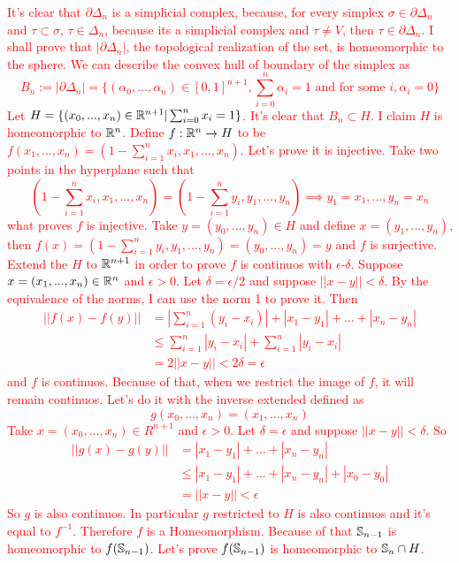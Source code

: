 \textcolor{red}{It's clear that $\partial \Delta_n$ is a simplicial complex, because, for
every simplex $\sigma \in \partial \Delta_n$ and $\tau \subset \sigma$, $\tau
\in \Delta_n$, because its a simplicial complex and $\tau \neq V$, then $\tau
\in \partial \Delta_n$. I shall prove that $|\partial \Delta_n|$, the
topological realization of the set, is homeomorphic to the sphere. 
We can describe the convex hull of boundary of the simplex as 
$$
B_n :=|\partial \Delta_n| = \{(\alpha_0, ..., \alpha_n) \in [0,1]^{n+1}, \sum_{i=0}^n \alpha_i = 1 \text{ and for some } i, \alpha_i = 0\}
$$
Let $H = \{(x_0, ..., x_n) \in \mathbb{R}^{n+1} | \sum_{i=0}^n x_i = 1\}$. It's clear
that $B_n \subset H$. I claim $H$ is homeomorphic to $\mathbb{R}^n$. Define
$f: \mathbb{R}^n \to H$ to be $f(x_1, ...,x_n) = (1 - \sum_{i=1}^n x_i, x_1, ...,
x_n)$. Let's prove it is injective. Take two points in the hyperplane such
that 
$$
(1 - \sum_{i=1}^n x_i, x_1, ...,
x_n) = (1 - \sum_{i=1}^n y_i, y_1, ...,
y_n) \implies y_1 = x_1, ..., y_n = x_n
$$
what proves $f$ is injective. Take $y = (y_0, ..., y_n) \in H$ and define $x =
(y_1, ..., y_n)$, then $f(x) = (1 - \sum_{i=1}^n y_i, y_1, ..., y_n) = (y_0,
..., y_n) = y$ and $f$ is surjective. Extend the $H$ to $\mathbb{R}^{n+1}$ in order to
prove $f$ is continuos with $\epsilon$-$\delta$. Suppose $x = (x_1, ..., x_n)
\in \mathbb{R}^n$ and $\epsilon > 0$. Let $\delta = \epsilon/2 $ and suppose $||x - y|| <
\delta$. By the equivalence of the norms, I can use the norm 1 to prove it. Then
\begin{equation*}
    \begin{split}
        ||f(x) - f(y)|| &= |\sum_{i=1}^n (y_i - x_i)| + |x_1 - y_1| + ... + |x_n - y_n| \\
        &\le \sum_{i=1}^n |y_i - x_i| + \sum_{i=1}^n |y_i - x_i| \\
        &= 2||x - y|| < 2\delta = \epsilon
    \end{split}
\end{equation*}
and $f$ is continuos. Because of that, when we restrict the image of $f$, it
will remain continuos. Let's do it with the inverse extended defined as
$$
g(x_0, ..., x_n) = (x_1,...,x_n)
$$
Take $x = (x_0,...,x_n) \in R^{n+1}$ and $\epsilon > 0$. Let $\delta =
\epsilon$ and suppose $||x-y||<\delta$. So 
\begin{equation*}
    \begin{split}
        ||g(x) - g(y)|| &= |x_1 - y_1| + ... + |x_n - y_n| \\
        &\le |x_1 - y_1| + ... + |x_n - y_n| + |x_0 - y_0| \\
        &= ||x-y|| < \epsilon
    \end{split}
\end{equation*}
So $g$ is also continuos. In particular $g$ restricted to $H$ is also
continuos and it's equal to $f^{-1}$. Therefore $f$ is a Homeomorphism.
Because of that $\mathbb{S}_{n-1}$ is homeomorphic to $f(\mathbb{S}_{n-1})$. Let's
prove $f(\mathbb{S}_{n-1})$ is homeomorphic to $\mathbb{S}_n \cap H$.}


